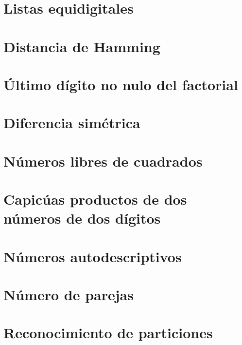 \documentclass[a4paper,12pt,twoside]{book}
\begin{document}
\chapter{Listas equidigitales}

\chapter{Distancia de Hamming}

\chapter{Último dígito no nulo del factorial}

\chapter{Diferencia simétrica}

\chapter{Números libres de cuadrados}

\chapter{Capicúas productos de dos números de dos dígitos}

 
\chapter{Números autodescriptivos}

\chapter{Número de parejas}

\chapter{Reconocimiento de particiones}
\end{document}
